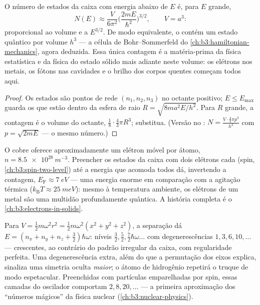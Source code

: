\begin{proposition}\label{prop:b3:schrodinger-three-dimensions:counting}
O número de estados da caixa com energia abaixo de $E$ é, para $E$
grande,
\[
N(E) \approx \frac{V}{6\pi^2}\Big(\frac{2mE}{\hbar^2}\Big)^{3/2} ,
\qquad V = a^3 :
\]
proporcional ao volume e a $E^{3/2}$. De modo equivalente, o  contém um estado quântico por volume $h^3$ --- a célula de
Bohr--Sommerfeld do \cref{ch:b3:hamiltonian-mechanics}, agora deduzida.
Essa única contagem é a matéria-prima da física estatística e da física
do estado sólido mais adiante neste volume: os elétrons nos metais, os
fótons nas cavidades e o brilho dos corpos quentes começam todos aqui.
\end{proposition}

\begin{proof}
Os estados são pontos de rede $(n_1, n_2, n_3)$ no octante positivo;
$E \le E_{\max}$ guarda os que estão dentro da esfera de raio $R =
\sqrt{8ma^2E/h^2}$. Para $R$ grande, a contagem é o volume do octante,
$\tfrac18\cdot\tfrac43\pi R^3$; substitua. (Versão no :
$N = \tfrac{V\cdot\frac43\pi p^3}{h^3}$ com $p = \sqrt{2mE}$ --- o
mesmo número.)
\end{proof}

\begin{example}\label{ex:b3:schrodinger-three-dimensions:metal}
O cobre oferece aproximadamente um elétron móvel por átomo, $n =
\qty{8.5e28}{m^{-3}}$. Preencher os estados da caixa com dois elétrons
cada (spin, \cref{ch:b3:spin-two-level}) até a energia que acomoda
todos dá, invertendo a contagem, $E_{\text{F}}
\approx \qty{7}{eV}$ --- uma energia enorme em comparação com a
agitação térmica ($k_{\text{B}}T \approx \qty{25}{meV}$): mesmo à
temperatura ambiente, os elétrons de um metal são uma multidão
profundamente quântica. A história completa é o
\cref{ch:b3:electrons-in-solids}.
\end{example}

\begin{example}\label{ex:b3:schrodinger-three-dimensions:oscillator}
Para $V = \tfrac12 m\omega^2r^2 = \tfrac12 m\omega^2(x^2 + y^2 +
z^2)$, a separação dá $E = (n_x + n_y + n_z + \tfrac32)\hbar\omega$:
níveis $\tfrac32, \tfrac52, \tfrac72\hbar\omega\ldots$ com
degenerescências $1, 3, 6, 10, \dots$ --- crescentes, ao contrário do
padrão irregular da caixa, com regularidade perfeita. Uma
degenerescência extra, além do que a permutação dos eixos explica,
sinaliza uma simetria oculta \emph{maior}; o átomo de hidrogênio
repetirá o truque de modo espetacular. Preenchidas com partículas
emparelhadas por spin, essas camadas do oscilador comportam $2,
8, 20, \dots$ --- a primeira aproximação dos ``números mágicos'' da
física nuclear (\cref{ch:b3:nuclear-physics}).
\end{example}

